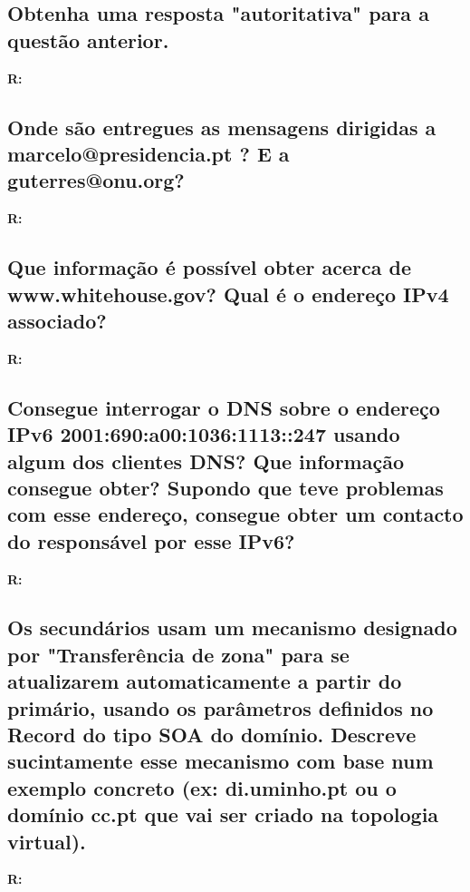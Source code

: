 \documentclass{llncs}
\begin{document}
\subsection{\textbf{Obtenha uma resposta "autoritativa" para a questão anterior.}}
\textbf{R:}


\subsection{\textbf{Onde são entregues as mensagens dirigidas a marcelo@presidencia.pt ? E a guterres@onu.org?}}
\textbf{R:}


\subsection{\textbf{Que informação é possível obter acerca de www.whitehouse.gov? Qual é o endereço IPv4 associado?}}
\textbf{R:}


\subsection{\textbf{Consegue interrogar o DNS sobre o endereço IPv6 2001:690:a00:1036:1113::247 usando algum dos clientes DNS? Que informação consegue obter? Supondo que teve problemas com esse endereço, consegue obter um contacto do responsável por esse IPv6?}}
\textbf{R:}


\subsection{\textbf{Os secundários usam um mecanismo designado por "Transferência de zona" para se atualizarem automaticamente a partir do primário, usando os parâmetros definidos no Record do tipo SOA do domínio. Descreve sucintamente esse mecanismo com base num exemplo concreto (ex: di.uminho.pt ou o domínio cc.pt que vai ser criado na topologia virtual).}}
\textbf{R:}
\end{document}
